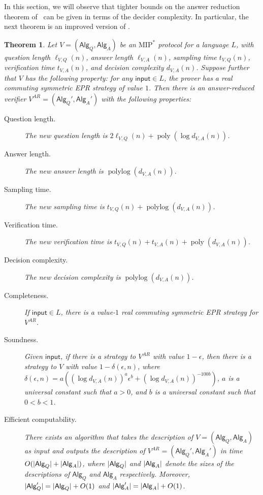 \documentclass[10pt,a4paper]{article}
\theoremstyle{plain}
\newtheorem{theorem}{Theorem}[section]
\theoremstyle{definition}
\DeclarePairedDelimiter{\abs}{\lvert}{\rvert}
\newcommand{\poly} {\ensuremath{\operatorname{poly}}}
\newcommand{\polylog} {\ensuremath{\operatorname{polylog}}}
\newcommand{\1}{\mathbb{1}} %
\newcommand{\ipt}{\mathsf{input}}
\newcommand{\Alg}{\mathsf{Alg}}
\newcommand{\MIP}{\mathrm{MIP}}
\begin{document}
In this section, we will observe that tighter bounds on the answer reduction theorem of~\cite{JNVWY'20,10.1145/3564246.3585208} can be given in terms of the decider complexity.
In particular, the next theorem is an improved version of \cite[Theorem 51]{10.1145/3564246.3585208}.
\begin{theorem}
    Let $V = (\Alg_Q, \Alg_A)$ be an $\MIP^*$ protocol for a language $L$, with question length $\ell_{V,Q}(n)$, 
    answer length $\ell_{V,A}(n)$,
    sampling time $t_{V,Q}(n)$, verification time $t_{V,A}(n)$, and decision complexity $d_{V,A}(n)$. 
    Suppose further that $V$ has the following property: for any $\ipt \in L$, the prover has a 
	real commuting symmetric EPR strategy of value $1$.
    Then there is an answer-reduced verifier $V^{AR} = (\Alg_Q', \Alg_A')$ with the following properties:
    \begin{description}
        \item[Question length.] The new question length is $2\ell_{V,Q}(n) + \poly(\log d_{V,A}(n))$.
        \item[Answer length.] The new answer length is $\polylog( d_{V,A}(n))$.
        \item[Sampling time.] The new sampling time is $t_{V,Q}(n) +\polylog (d_{V,A}(n))$.
        \item[Verification time.] The new verification time is $t_{V,Q}(n) + t_{V,A}(n)+ \poly(d_{V,A}(n))$. 
        \item[Decision complexity.] The new decision complexity is $\polylog(d_{V,A}(n))$.
        \item[Completeness.] If $\ipt \in L$, there is a value-$1$ real commuting symmetric EPR strategy for $V^{AR}$.
        \item[Soundness.] Given $\ipt$, if there is a strategy to $V^{AR}$ with value $1 -\epsilon$, then there is a strategy to $V$ with value $1 - 
    \delta(
    \epsilon, n)$, where $\delta(\epsilon, n) = a((\log d_{V,A}(n))^{a}\epsilon^b + (\log d_{V,A}(n))^{-100b})$, $a$ is a universal constant such that $a>0$, and $b$ is a universal constant such that $0 < b < 1$.
        \item[Efficient computability.] There exists an algorithm that takes the description of $V = (\Alg_Q, \Alg_A)$ as input and outputs the description of $V^{AR} = (\Alg_Q', \Alg_A')$ in time $O( \abs{\Alg_Q}+ \abs{\Alg_A})$,
        where $\abs{\Alg_Q}$ and $\abs{\Alg_A}$ denote the sizes of the descriptions of $\Alg_Q$ and $\Alg_A$ respectively.
        Moreover, $\abs{\Alg_Q'} = \abs{\Alg_Q} +O(1)$ and $\abs{\Alg_A'} = \abs{\Alg_A}+O(1)$.
    \end{description}
\end{theorem}
\end{document}
